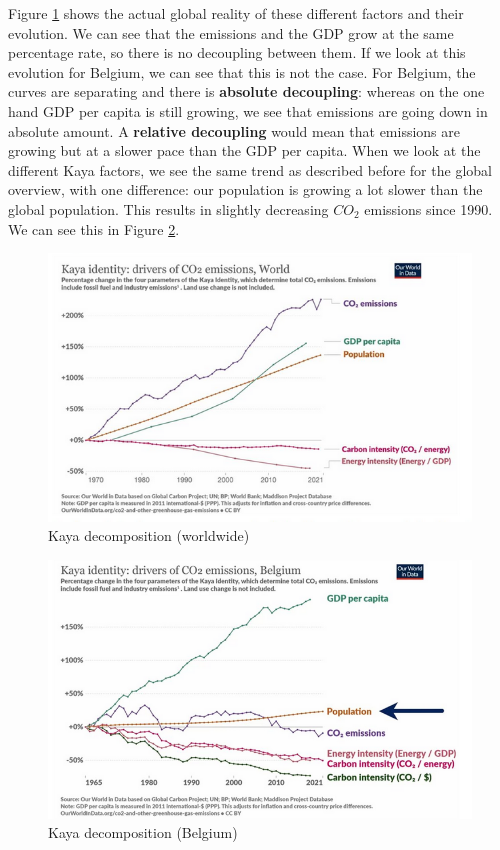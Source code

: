 \documentclass[../summary.tex]{subfiles}
\begin{document}
	Figure \ref{fig:Kaya-decomposition-world} shows the actual global reality of these different factors and their evolution. We can see that the emissions and the GDP grow at the same percentage rate, so there is no decoupling between them. If we look at this evolution for Belgium, we can see that this is not the case. For Belgium, the curves are separating and there is \textbf{absolute decoupling}: whereas on the one hand GDP per capita is still growing, we see that emissions are going down in absolute amount. A \textbf{relative decoupling} would mean that emissions are growing but at a slower pace than the GDP per capita. When we look at the different Kaya factors, we see the same trend as described before for the global overview, with one difference: our population is growing a lot slower than the global population. This results in slightly decreasing $CO_{2}$ emissions since 1990. We can see this in Figure \ref{fig:kaya-decomposition-belgium}.
	
	\begin{figure}[htbp]
		\centering
		\includegraphics[width=1\linewidth]{images/10-kaya-decomposition-worldwide.png}
		\caption{Kaya decomposition (worldwide)}
		\label{fig:Kaya-decomposition-world}
	\end{figure}
	
	\begin{figure}[htbp]
		\centering
		\includegraphics[width=1\linewidth]{images/10-Kaya-decomposition-belgium.png}
		\caption{Kaya decomposition (Belgium)}
		\label{fig:kaya-decomposition-belgium}
	\end{figure}
	\newpage
\end{document}
